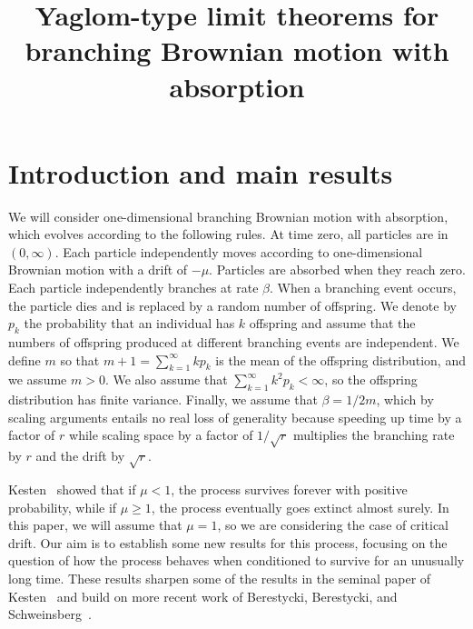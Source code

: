 \documentclass[AHL,Unicode,longabstracts,published]{cedram}
\title[Yaglom limits for BBM with absorption]{Yaglom-type limit theorems for branching Brownian motion with absorption}
\author[\initial{P.} \lastname{Maillard}]{\firstname{Pascal} \lastname{Maillard}}
\author[\initial{J.} \lastname{Schweinsberg}]{\firstname{Jason} \lastname{Schweinsberg}}
\newcommand{\1} {\mathds{1}}
\begin{document}
\maketitle

\section{Introduction and main results}

We will consider one-dimensional branching Brownian motion with absorption, which evolves according to the following rules. At time zero, all particles are in $(0, \infty)$. Each particle independently moves according to one-dimensional Brownian motion with a drift of $-\mu$. Particles are absorbed when they reach zero. Each particle independently branches at rate $\beta$. When a branching event occurs, the particle dies and is replaced by a random number of offspring. We denote by $p_k$ the probability that an individual has $k$ offspring and assume that the numbers of offspring produced at different branching events are independent. We define $m$ so that $m + 1 = \sum_{k=1}^{\infty} kp_k$ is the mean of the offspring distribution, and we assume $m > 0$. We also assume that $\sum_{k=1}^{\infty} k^2 p_k < \infty$, so the offspring distribution has finite variance. Finally, we assume that $\beta = 1/2m$, which by scaling arguments entails no real loss of generality because speeding up time by a factor of $r$ while scaling space by a factor of $1/\sqrt{r}$ multiplies the branching rate by $r$ and the drift by $\sqrt{r}$.

Kesten~\cite{kesten} showed that if $\mu < 1$, the process survives forever with positive probability, while if $\mu \geq 1$, the process eventually goes extinct almost surely. In this paper, we will assume that $\mu = 1$, so we are considering the case of critical drift. Our aim is to establish some new results for this process, focusing on the question of how the process behaves when conditioned to survive for an unusually long time. These results sharpen some of the results in the seminal paper of Kesten~\cite{kesten} and build on more recent work of Berestycki, Berestycki, and Schweinsberg~\cite{bbs, bbs3}.
\end{document}
